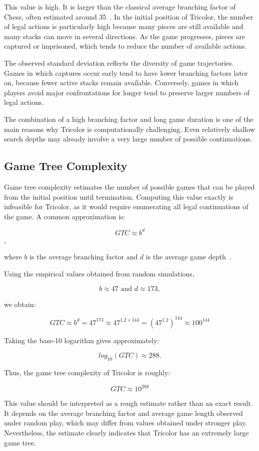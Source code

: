 This value is high. It is larger than the classical average branching factor of Chess, often estimated around 35~\cite{shannon1950chess2}. In the initial position of Tricolor, the number of legal actions is particularly high because many pieces are still available and many stacks can move in several directions. As the game progresses, pieces are captured or imprisoned, which tends to reduce the number of available actions.

The observed standard deviation reflects the diversity of game trajectories. Games in which captures occur early tend to have lower branching factors later on, because fewer active stacks remain available. Conversely, games in which players avoid major confrontations for longer tend to preserve larger numbers of legal actions.

The combination of a high branching factor and long game duration is one of the main reasons why Tricolor is computationally challenging. Even relatively shallow search depths may already involve a very large number of possible continuations.

\subsection{Game Tree Complexity}

Game tree complexity estimates the number of possible games that can be played from the initial position until termination. Computing this value exactly is infeasible for Tricolor, as it would require enumerating all legal continuations of the game. A common approximation is:

\[ GTC \approx b^d \],

where $b$ is the average branching factor and $d$ is the average game depth~\cite{shannon1950chess2}.

Using the empirical values obtained from random simulations,

\[ b\approx47 \text{ and } d\approx173, \]

we obtain:

\[ GTC \approx b^d = 47^{173} \approx 47^{1.2 \times 144} = ({47^{1.2}})^{144} \approx 100^{144}\]

Taking the base-10 logarithm gives approximately:

 \[ log_{10}(GTC) \approx 288. \]

Thus, the game tree complexity of Tricolor is roughly:

 \[ GTC \approx 10^{288} \]

This value should be interpreted as a rough estimate rather than an exact result. It depends on the average branching factor and average game length observed under random play, which may differ from values obtained under stronger play. Nevertheless, the estimate clearly indicates that Tricolor has an extremely large game tree.

